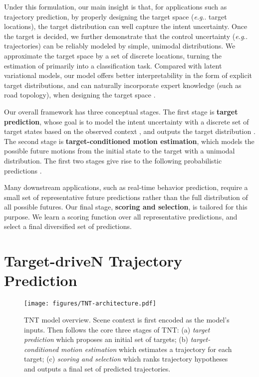 \documentclass{article}
\makeatletter
\DeclareRobustCommand\onedot{\futurelet\@let@token\@onedot}
\def\@onedot{\ifx\@let@token.\else.\null\fi\xspace}
\newcommand{\model}{TNT\xspace}
\def\eg{\emph{e.g}\onedot} \def\Eg{\emph{E.g}\onedot}
\makeatother
\begin{document}
Under this formulation, our main insight is that, for applications such as trajectory prediction, by properly designing the target space  (\eg target locations), the target distribution  can well capture the intent uncertainty. Once the target is decided, we further demonstrate that the control uncertainty (\eg trajectories) can be reliably modeled by simple, unimodal distributions.
We approximate the target space  by a set of discrete locations, turning the estimation of  primarily into a classification task. Compared with latent variational models, our model offers better interpretability in the form of explicit target distributions, and can naturally incorporate expert knowledge (such as road topology), when designing the target space .

Our overall framework has three conceptual stages. The first stage is \textbf{target prediction}, whose goal is to model the intent uncertainty with a discrete set of target states  based on the observed context , and outputs the target distribution . The second stage is \textbf{target-conditioned motion estimation}, which models the possible future motions from the initial state to the target with a unimodal distribution. The first two stages give rise to the following probabilistic predictions
.

Many downstream applications, such as real-time behavior prediction, require a small set of representative future predictions rather than the full distribution of all possible futures. Our final stage, \textbf{scoring and selection}, is tailored for this purpose.
We learn a scoring function 
over all representative predictions, and select  a final diversified set of predictions. \section{Target-driveN Trajectory Prediction}

\begin{figure}
    \centering
    \texttt{[image: figures/TNT-architecture.pdf]}
    \caption{\model model overview. Scene context is first encoded as the model's inputs.
Then follows the core three stages of \model: (a) {\em target prediction} which proposes an initial set of  targets; (b) {\em target-conditioned motion estimation} which estimates a trajectory for each target; (c) {\em scoring and selection} which ranks trajectory hypotheses and outputs a final set of  predicted trajectories.}
    \label{fig:pipeline}
\end{figure}
\end{document}
